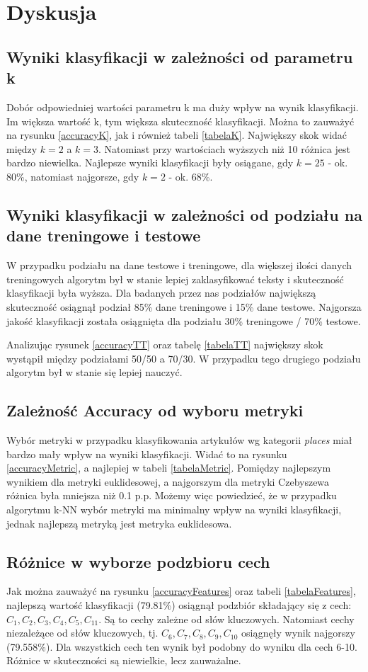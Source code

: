 \documentclass{classrep}
\begin{document}
\newpage
\section{Dyskusja} %
\subsection{Wyniki klasyfikacji w zależności od parametru k}
Dobór odpowiedniej wartości parametru k ma duży wpływ na wynik klasyfikacji. Im większa wartość k, tym większa skuteczność klasyfikacji. Można to zauważyć na rysunku \ref{accuracyK}, jak i również tabeli \ref{tabelaK}. Największy skok widać między $k=2$ a $k=3$. Natomiast przy wartościach wyższych niż 10 różnica jest bardzo niewielka. Najlepsze wyniki klasyfikacji były osiągane, gdy $k=25$ - ok. 80\%, natomiast najgorsze, gdy $k=2$ - ok. 68\%. 
\subsection{Wyniki klasyfikacji w zależności od podziału na dane treningowe i testowe}
W przypadku podziału na dane testowe i treningowe, dla większej ilości danych treningowych algorytm był w stanie lepiej zaklasyfikować teksty i skuteczność klasyfikacji była wyższa. Dla badanych przez nas podziałów największą skuteczność osiągnął podział 85\% dane treningowe i 15\% dane testowe. Najgorsza jakość klasyfikacji została osiągnięta dla podziału 30\% treningowe / 70\% testowe. 

Analizując rysunek \ref{accuracyTT} oraz tabelę \ref{tabelaTT} największy skok wystąpił między podziałami 50/50 a 70/30. W przypadku tego drugiego podziału algorytm był w stanie się lepiej nauczyć.
\subsection{Zależność Accuracy od wyboru metryki}
Wybór metryki w przypadku klasyfikowania artykułów wg kategorii \textsl{places} miał bardzo mały wpływ na wyniki klasyfikacji. Widać to na rysunku \ref{accuracyMetric}, a najlepiej w tabeli \ref{tabelaMetric}. Pomiędzy najlepszym wynikiem dla metryki euklidesowej, a najgorszym dla metryki Czebyszewa różnica była mniejsza niż 0.1 p.p. Możemy więc powiedzieć, że w przypadku algorytmu k-NN wybór metryki ma minimalny wpływ na wyniki klasyfikacji, jednak najlepszą metryką jest metryka euklidesowa.
\subsection{Różnice w wyborze podzbioru cech}
Jak można zauważyć na rysunku \ref{accuracyFeatures} oraz tabeli \ref{tabelaFeatures}, najlepszą wartość klasyfikacji (79.81\%) osiągnął podzbiór składający się z cech: $C_1, C_2, C_3, C_4, C_5, C_{11}$. Są to cechy zależne od słów kluczowych. Natomiast cechy niezależące od słów kluczowych, tj. $C_6, C_7, C_8, C_9, C_{10}$ osiągnęły wynik najgorszy (79.558\%). Dla wszystkich cech ten wynik był podobny do wyniku dla cech 6-10. Różnice w skuteczności są niewielkie, lecz zauważalne. 
\end{document}
